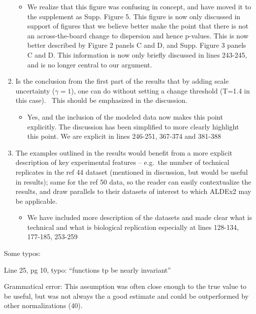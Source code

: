 \documentclass[
]{article}
\providecommand{\tightlist}{%
  \setlength{\itemsep}{0pt}\setlength{\parskip}{0pt}}
\begin{document}
\begin{enumerate}
  \begin{itemize}
  \tightlist
  \item
    We realize that this figure was confusing in concept, and have moved
    it to the supplement as Supp. Figure 5. This figure is now only
    discussed in support of figures that we believe better make the
    point that there is not an across-the-board change to dispersion and
    hence p-values. This is now better described by Figure 2 panels C
    and D, and Supp. Figure 3 panels C and D. This information is now
    only briefly discussed in lines 243-245, and is no longer central to
    our argument.
  \end{itemize}
\item
  Is the conclusion from the first part of the results that by adding
  scale uncertainty (\(\gamma =1\)), one can do without setting a change
  threshold (T=1.4 in this case). ~This should be emphasized in the
  discussion.

  \begin{itemize}
  \tightlist
  \item
    Yes, and the inclusion of the modeled data now makes this point
    explicitly. The discussion has been simplified to more clearly
    highlight this point. We are explicit in lines 246-251, 367-374 and
    381-388
  \end{itemize}
\item
  The examples outlined in the results would benefit from a more
  explicit description of key experimental features -- e.g.~the number
  of technical replicates in the ref 44 dataset (mentioned in
  discussion, but would be useful in results); same for the ref 50 data,
  so the reader can easily contextualize the results, and draw parallels
  to their datasets of interest to which ALDEx2 may be applicable.

  \begin{itemize}
  \tightlist
  \item
    We have included more description of the datasets and made clear
    what is technical and what is biological replication especially at
    lines 128-134, 177-185, 253-259
  \end{itemize}
\end{enumerate}

Some typos:

Line 25, pg 10, typo: ``functions tp be nearly invariant''

Grammatical error: This assumption was often close enough to the true
value to be useful, but was not always the a good estimate and could be
outperformed by other normalizations (40).
\end{document}
